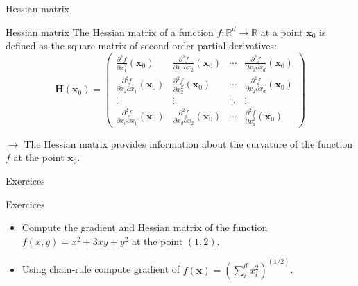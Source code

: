 \documentclass[aspectratio=1610]{beamer}
\begin{document}
\begin{frame}{Hessian matrix}

  \begin{block}{Hessian matrix}
    The Hessian matrix of a function $f:\mathbb{R}^d \to \mathbb{R}$ at a point $\mathbf{x}_0$ is defined as the square matrix of second-order partial derivatives:
    $$\mathbf{H}(\mathbf{x}_0) = \begin{pmatrix}
      \frac{\partial^2 f}{\partial x_1^2}(\mathbf{x}_0) & \frac{\partial^2 f}{\partial x_1 \partial x_2}(\mathbf{x}_0) & \cdots & \frac{\partial^2 f}{\partial x_1 \partial x_d}(\mathbf{x}_0) \\
      \frac{\partial^2 f}{\partial x_2 \partial x_1}(\mathbf{x}_0) & \frac{\partial^2 f}{\partial x_2^2}(\mathbf{x}_0) & \cdots & \frac{\partial^2 f}{\partial x_2 \partial x_d}(\mathbf{x}_0) \\
      \vdots & \vdots & \ddots & \vdots \\
      \frac{\partial^2 f}{\partial x_d \partial x_1}(\mathbf{x}_0) & \frac{\partial^2 f}{\partial x_d \partial x_2}(\mathbf{x}_0) & \cdots & \frac{\partial^2 f}{\partial x_d^2}(\mathbf{x}_0)
    \end{pmatrix}$$
  \end{block}

  $\rightarrow$ The Hessian matrix provides information about the curvature of the function $f$ at the point $\mathbf{x}_0$.
\end{frame}


\begin{frame}{Exercices}
  \begin{block}{Exercices}
    \begin{itemize}
      \item Compute the gradient and Hessian matrix of the function $f(x,y) = x^2 + 3xy + y^2$ at the point $(1,2)$.
      \item Using chain-rule compute gradient of $f(\mathbf{x}) = (\sum_i^{d}x_i^2)^(1/2)$.
    \end{itemize}
  \end{block}
\end{frame}
\end{document}
